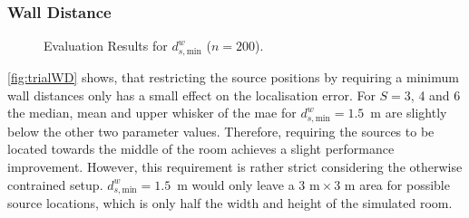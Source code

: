 \subsubsection*{Wall Distance}

\begin{figure}[H]
\iftoggle{quick}{%
    \texttt{[image: plots/boxplots/boxplot-joined-wd]}
}{%
    
}   
	\caption[Evaluation Results for $d^w_{s,\text{min}}$]{Evaluation Results for $d^w_{s,\text{min}}$ ($n=200$).}
	\label{fig:trialWD}
\end{figure}

\autoref{fig:trialWD} shows, that restricting the source positions by requiring a minimum wall distances only has a small effect on the localisation error. For $S=3$, 4 and 6 the median, mean and upper whisker of the \gls{mae} for $d_{s,\text{min}}^w=1.5$~m are slightly below the other two parameter values. Therefore, requiring the sources to be located towards the middle of the room achieves a slight performance improvement. However, this requirement is rather strict considering the otherwise contrained setup. $d_{s,\text{min}}^w=1.5$~m would only leave a ${3\text{~m}\times 3\text{~m}}$ area for possible source locations, which is only half the width and height of the simulated room.